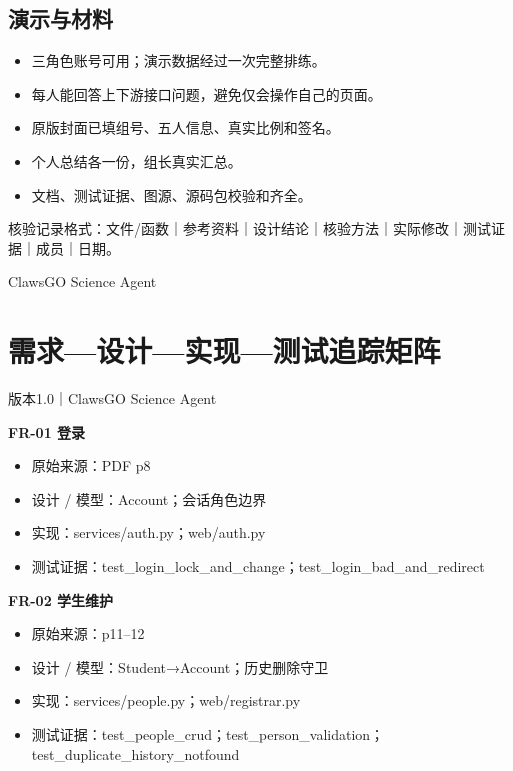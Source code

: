 \documentclass[UTF8,11pt,a4paper]{ctexart}
\providecommand{\tightlist}{\setlength{\itemsep}{0pt}\setlength{\parskip}{0pt}}
\begin{document}
\hypertarget{ux6f14ux793aux4e0eux6750ux6599}{%
\subsection{演示与材料}\label{ux6f14ux793aux4e0eux6750ux6599}}

\begin{itemize}
\tightlist
\item[$\square$]
  三角色账号可用；演示数据经过一次完整排练。
\item[$\square$]
  每人能回答上下游接口问题，避免仅会操作自己的页面。
\item[$\square$]
  原版封面已填组号、五人信息、真实比例和签名。
\item[$\square$]
  个人总结各一份，组长真实汇总。
\item[$\square$]
  文档、测试证据、图源、源码包校验和齐全。
\end{itemize}

核验记录格式：文件/函数｜参考资料｜设计结论｜核验方法｜实际修改｜测试证据｜成员｜日期。

ClawsGO Science Agent

\clearpage
\hypertarget{ux9700ux6c42ux8bbeux8ba1ux5b9eux73b0ux6d4bux8bd5ux8ffdux8e2aux77e9ux9635}{%
\section{需求---设计---实现---测试追踪矩阵}\label{ux9700ux6c42ux8bbeux8ba1ux5b9eux73b0ux6d4bux8bd5ux8ffdux8e2aux77e9ux9635}}

版本1.0｜ClawsGO Science Agent

\textbf{FR-01 登录}

\begin{itemize}
\tightlist
\item
  原始来源：PDF p8
\item
  设计 / 模型：Account；会话角色边界
\item
  实现：services/auth.py；web/auth.py
\item
  测试证据：test\_\allowbreak{}login\_\allowbreak{}lock\_\allowbreak{}and\_\allowbreak{}change；test\_\allowbreak{}login\_\allowbreak{}bad\_\allowbreak{}and\_\allowbreak{}redirect
\end{itemize}

\textbf{FR-02 学生维护}

\begin{itemize}
\tightlist
\item
  原始来源：p11--12
\item
  设计 / 模型：Student→Account；历史删除守卫
\item
  实现：services/people.py；web/registrar.py
\item
  测试证据：test\_\allowbreak{}people\_\allowbreak{}crud；test\_\allowbreak{}person\_\allowbreak{}validation；test\_\allowbreak{}duplicate\_\allowbreak{}history\_\allowbreak{}notfound
\end{itemize}
\end{document}
